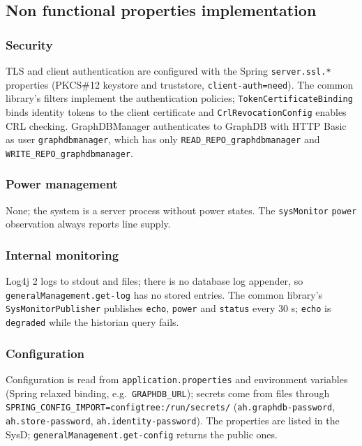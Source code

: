 \documentclass[a4paper]{arrowhead}
\begin{document}
\subsection{Non functional properties implementation}

\subsubsection{Security}

TLS and client authentication are configured with the Spring \texttt{server.\allowbreak{}ssl.\allowbreak{}*} properties (PKCS\#12 keystore and truststore, \texttt{client-\allowbreak{}auth=\allowbreak{}need}). The common library's filters implement the authentication policies; \texttt{Token\allowbreak{}Certificate\allowbreak{}Binding} binds identity tokens to the client certificate and \texttt{Crl\allowbreak{}Revocation\allowbreak{}Config} enables CRL checking. GraphDBManager authenticates to GraphDB with HTTP Basic as user \texttt{graphdbmanager}, which has only \texttt{READ\_\allowbreak{}REPO\_\allowbreak{}graphdbmanager} and \texttt{WRITE\_\allowbreak{}REPO\_\allowbreak{}graphdbmanager}.

\subsubsection{Power management}

None; the system is a server process without power states. The \texttt{sysMonitor} \texttt{power} observation always reports line supply.

\subsubsection{Internal monitoring}

Log4j 2 logs to stdout and files; there is no database log appender, so \texttt{general\allowbreak{}Management.\allowbreak{}get-\allowbreak{}log} has no stored entries. The common library's \texttt{Sys\allowbreak{}Monitor\allowbreak{}Publisher} publishes \texttt{echo}, \texttt{power} and \texttt{status} every 30 s; \texttt{echo} is \texttt{degraded} while the historian query fails.

\subsubsection{Configuration}

Configuration is read from \texttt{application.\allowbreak{}properties} and environment variables (Spring relaxed binding, e.g.\ \texttt{GRAPHDB\_\allowbreak{}URL}); secrets come from files through \texttt{SPRING\_\allowbreak{}CONFIG\_\allowbreak{}IMPORT=\allowbreak{}configtree:\allowbreak{}/\allowbreak{}run/\allowbreak{}secrets/\allowbreak{}} (\texttt{ah.\allowbreak{}graphdb-\allowbreak{}password}, \texttt{ah.\allowbreak{}store-\allowbreak{}password}, \texttt{ah.\allowbreak{}identity-\allowbreak{}password}). The properties are listed in the SysD; \texttt{general\allowbreak{}Management.\allowbreak{}get-\allowbreak{}config} returns the public ones.
\end{document}
